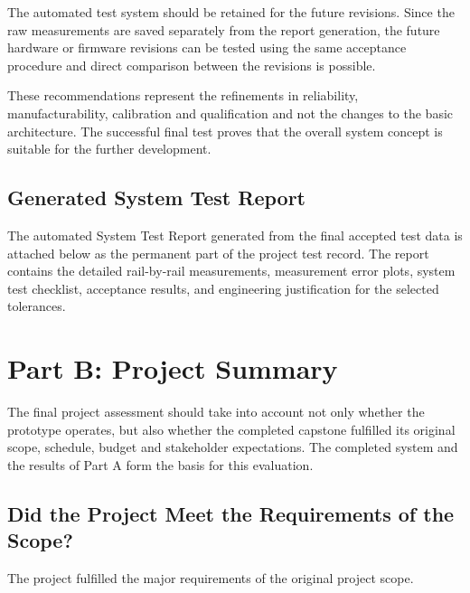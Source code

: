 The automated test system should be retained for the future revisions. Since the raw measurements are saved separately from the report generation, the future hardware or firmware revisions can be tested using the same acceptance procedure and direct comparison between the revisions is possible.

These recommendations represent the refinements in reliability, manufacturability, calibration and qualification and not the changes to the basic architecture. The successful final test proves that the overall system concept is suitable for the further development.

\subsection{Generated System Test Report}
\label{sec:generated-test-report}

The automated System Test Report generated from the final accepted test data is attached below as the permanent part of the project test record. The report contains the detailed rail-by-rail measurements, measurement error plots, system test checklist, acceptance results, and engineering justification for the selected tolerances.

\clearpage



\clearpage


\section{Part B: Project Summary}
\label{sec:part-b-project-summary}

The final project assessment should take into account not only whether the prototype operates, but also whether the completed capstone fulfilled its original scope, schedule, budget and stakeholder expectations. The completed system and the results of Part A form the basis for this evaluation.

\subsection{Did the Project Meet the Requirements of the Scope?}

The project fulfilled the major requirements of the original project scope.

